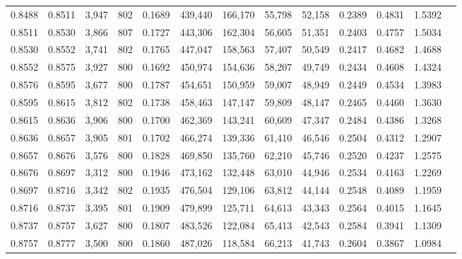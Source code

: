 \begin{tabular}{rrrrrrrrrrrrr}
0.8488 & 0.8511 &  3,947 & 802 &                                     0.1689 & 439,440 & 166,170 &  55,798 &  52,158 & 0.2389 & 0.4831 & 1.5392 \\
0.8511 & 0.8530 &  3,866 & 807 &                                     0.1727 & 443,306 & 162,304 &  56,605 &  51,351 & 0.2403 & 0.4757 & 1.5034 \\
0.8530 & 0.8552 &  3,741 & 802 &                                     0.1765 & 447,047 & 158,563 &  57,407 &  50,549 & 0.2417 & 0.4682 & 1.4688 \\
0.8552 & 0.8575 &  3,927 & 800 &                                     0.1692 & 450,974 & 154,636 &  58,207 &  49,749 & 0.2434 & 0.4608 & 1.4324 \\
0.8576 & 0.8595 &  3,677 & 800 &                                     0.1787 & 454,651 & 150,959 &  59,007 &  48,949 & 0.2449 & 0.4534 & 1.3983 \\
0.8595 & 0.8615 &  3,812 & 802 &                                     0.1738 & 458,463 & 147,147 &  59,809 &  48,147 & 0.2465 & 0.4460 & 1.3630 \\
0.8615 & 0.8636 &  3,906 & 800 &                                     0.1700 & 462,369 & 143,241 &  60,609 &  47,347 & 0.2484 & 0.4386 & 1.3268 \\
0.8636 & 0.8657 &  3,905 & 801 &                                     0.1702 & 466,274 & 139,336 &  61,410 &  46,546 & 0.2504 & 0.4312 & 1.2907 \\
0.8657 & 0.8676 &  3,576 & 800 &                                     0.1828 & 469,850 & 135,760 &  62,210 &  45,746 & 0.2520 & 0.4237 & 1.2575 \\
0.8676 & 0.8697 &  3,312 & 800 &                                     0.1946 & 473,162 & 132,448 &  63,010 &  44,946 & 0.2534 & 0.4163 & 1.2269 \\
0.8697 & 0.8716 &  3,342 & 802 &                                     0.1935 & 476,504 & 129,106 &  63,812 &  44,144 & 0.2548 & 0.4089 & 1.1959 \\
0.8716 & 0.8737 &  3,395 & 801 &                                     0.1909 & 479,899 & 125,711 &  64,613 &  43,343 & 0.2564 & 0.4015 & 1.1645 \\
0.8737 & 0.8757 &  3,627 & 800 &                                     0.1807 & 483,526 & 122,084 &  65,413 &  42,543 & 0.2584 & 0.3941 & 1.1309 \\
0.8757 & 0.8777 &  3,500 & 800 &                                     0.1860 & 487,026 & 118,584 &  66,213 &  41,743 & 0.2604 & 0.3867 & 1.0984 \\

\end{tabular}
